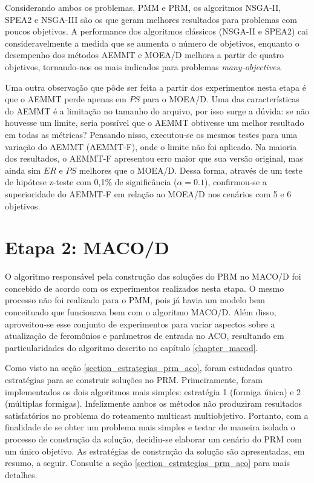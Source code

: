 Considerando ambos os problemas, PMM e PRM, os algoritmos NSGA-II, SPEA2 e NSGA-III são os que geram melhores resultados para problemas com poucos objetivos. A performance dos algoritmos clássicos (NSGA-II e SPEA2) cai consideravelmente a medida que se aumenta o número de objetivos, enquanto o desempenho dos métodos AEMMT e MOEA/D melhora a partir de quatro objetivos, tornando-nos os mais indicados para problemas \textit{many-objectives}.

Uma outra observação que pôde ser feita a partir dos experimentos nesta etapa é que o AEMMT perde apenas em $PS$ para o MOEA/D. Uma das características do AEMMT é a limitação no tamanho do arquivo, por isso surge a dúvida: se não houvesse um limite, seria possível que o AEMMT obtivesse um melhor resultado em todas as métricas? Pensando nisso, executou-se os mesmos testes para uma variação do AEMMT (AEMMT-F), onde o limite não foi aplicado. Na maioria dos resultados, o AEMMT-F apresentou erro maior que sua versão original, mas ainda sim $ER$ e $PS$ melhores que o MOEA/D. Dessa forma, através de um teste de hipótese z-teste com 0,1\% de significância ($\alpha = 0.1$), confirmou-se a superioridade do AEMMT-F em relação ao MOEA/D nos cenários com 5 e 6 objetivos.

\section{Etapa 2: MACO/D}
\label{section_experimentos_etapa2}

O algoritmo responsável pela construção das soluções do PRM no MACO/D foi concebido de acordo com os experimentos realizados nesta etapa. O mesmo processo não foi realizado para o PMM, pois já havia um modelo bem conceituado que funcionava bem com o algoritmo MACO/D. Além disso, aproveitou-se esse conjunto de experimentos para variar aspectos sobre a atualização de feromônios e parâmetros de entrada no ACO, resultando em particularidades do algoritmo descrito no capítulo \ref{chapter_macod}.

Como visto na seção \ref{section_estrategias_prm_aco}, foram estudadas quatro estratégias para se construir soluções no PRM. Primeiramente, foram implementados os dois algoritmos mais simples: estratégia 1 (formiga única) e 2 (múltiplas formigas). Infelizmente ambos os métodos não produziram resultados satisfatórios no problema do roteamento multicast multiobjetivo. Portanto, com a finalidade de se obter um problema mais simples e testar de maneira isolada o processo de construção da solução, decidiu-se elaborar um cenário do PRM com um único objetivo. As estratégias de construção da solução são apresentadas, em resumo, a seguir. Consulte a seção \ref{section_estrategias_prm_aco} para mais detalhes.

